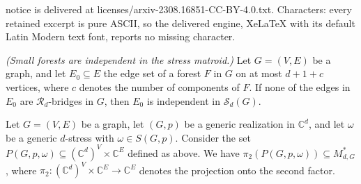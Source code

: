 \documentclass[10pt,a4paper]{amsart}
\newcommand{\CC}{\mathbb{C}}
\newcommand{\stressmatroid}[2]{\mathcal{S}_{#1}(#2)}
\begin{document}
notice is delivered at licenses/arxiv-2308.16851-CC-BY-4.0.txt. Characters: every retained excerpt is pure ASCII, so the delivered engine, XeLaTeX with its default Latin Modern text font, reports no missing character.
\begin{theorem}\label{theorem:projectiveimages} \emph{(Small forests are independent in the stress matroid.)}\newline
    Let $G = (V,E)$ be a graph, and let $E_0 \subseteq E$ the edge set of a forest $F$ in $G$ on at most $d+1+c$ vertices, where $c$ denotes the number of components of $F$.
    If none of the edges in $E_0$ are $\mathcal{R}_d$-bridges in $G$, then $E_0$ is independent in $\stressmatroid{d}{G}$.
\end{theorem}

\begin{lemma}\label{lemma:projectivetechnical}
    Let $G = (V,E)$ be a graph, let $(G,p)$ be a generic realization in $\CC^d$, and let $\omega$ be a generic $d$-stress with $\omega \in S(G,p)$. Consider the set $P(G,p,\omega) \subseteq (\CC^{d})^V \times \CC^E $ defined as above. %
    We have $\pi_2(P(G,p,\omega)) \subseteq M_{d,G}^*$, where $\pi_2 : (\CC^{d})^V \times \CC^E \rightarrow \CC^{E}$ denotes the projection onto the second factor.
\end{lemma}
\end{document}
